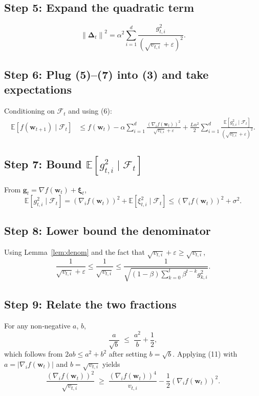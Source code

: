 \documentclass{article}
\newcommand{\E}{\mathbb{E}}
\newcommand{\norm}[1]{\left\|#1\right\|}
\begin{document}
\subsection*{Step 5: Expand the quadratic term}
\[
\norm{\bm \Delta_{t}}^{2}
= \alpha^{2}\sum_{i=1}^{d}\frac{g_{t,i}^{2}}{(\sqrt{v_{t,i}}+\varepsilon)^{2}}.
\tag{7}
\]

\subsection*{Step 6: Plug (5)–(7) into (3) and take expectations}
Conditioning on $\mathcal{F}_{t}$ and using (6):
\[
\begin{aligned}
\E\!\left[f(\bm w_{t+1})\mid\mathcal{F}_{t}\right]
&\le f(\bm w_{t})
-\alpha\sum_{i=1}^{d}\frac{(\nabla_{i}f(\bm w_{t}))^{2}}{\sqrt{v_{t,i}}+\varepsilon}
+\frac{L\alpha^{2}}{2}\sum_{i=1}^{d}\frac{\E[g_{t,i}^{2}\mid\mathcal{F}_{t}]}{(\sqrt{v_{t,i}}+\varepsilon)^{2}}.
\end{aligned}
\tag{8}
\]

\subsection*{Step 7: Bound $\E[g_{t,i}^{2}\mid\mathcal{F}_{t}]$}
From $\bm g_{t}= \nabla f(\bm w_{t})+\bm \xi_{t}$,
\[
\E[g_{t,i}^{2}\mid\mathcal{F}_{t}]
= (\nabla_{i}f(\bm w_{t}))^{2} + \E[\xi_{t,i}^{2}\mid\mathcal{F}_{t}]
\le (\nabla_{i}f(\bm w_{t}))^{2} + \sigma^{2}.
\tag{9}
\]

\subsection*{Step 8: Lower bound the denominator}
Using Lemma~\ref{lem:denom} and the fact that $\sqrt{v_{t,i}}+\varepsilon\ge\sqrt{v_{t,i}}$,
\[
\frac{1}{\sqrt{v_{t,i}}+\varepsilon}
\le\frac{1}{\sqrt{v_{t,i}}}
\le\frac{1}{\sqrt{(1-\beta)\sum_{k=0}^{t}\beta^{t-k}g_{k,i}^{2}}}.
\tag{10}
\]

\subsection*{Step 9: Relate the two fractions}
For any non‑negative $a$, $b$,
\[
\frac{a}{\sqrt{b}} \;\le\; \frac{a^{2}}{b}+ \frac12,
\tag{11}
\]
which follows from $2ab\le a^{2}+b^{2}$ after setting $b=\sqrt{b}$. Applying (11) with $a=|\nabla_{i}f(\bm w_{t})|$ and $b=\sqrt{v_{t,i}}$ yields
\[
\frac{(\nabla_{i}f(\bm w_{t}))^{2}}{\sqrt{v_{t,i}}}
\;\ge\; \frac{(\nabla_{i}f(\bm w_{t}))^{4}}{v_{t,i}}-\frac12(\nabla_{i}f(\bm w_{t}))^{2}.
\tag{12}
\]
\end{document}
